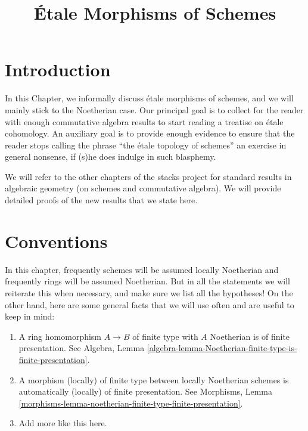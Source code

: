 

%


\title{\'Etale Morphisms of Schemes}

\maketitle

\label{section-phantom}

\tableofcontents



\section{Introduction}
\label{section-introduction}

\noindent
In this Chapter, we informally discuss \'etale morphisms of schemes,
and we will mainly stick to the Noetherian case. Our principal goal
is to collect for the reader with enough commutative algebra results
to start reading a treatise on \'etale cohomology. An auxiliary goal is to
provide enough evidence to ensure that the reader stops calling the phrase
``the \'etale topology of schemes'' an exercise in general nonsense, if (s)he
does indulge in such blasphemy.

\medskip\noindent
We will refer to the other
chapters of the stacks project for standard results in algebraic geometry
(on schemes and commutative algebra). We will provide detailed
proofs of the new results that we state here.




\section{Conventions}
\label{section-conventions}

\noindent
In this chapter, frequently schemes will be assumed locally Noetherian
and frequently rings will be assumed Noetherian. But in all the statements
we will reiterate this when necessary, and make sure we list all the
hypotheses! On the other hand, here are some general facts that we will use
often and are useful to keep in mind:
\begin{enumerate}
\item A ring homomorphism $A \to B$ of finite type with $A$ Noetherian
is of finite presentation. See Algebra,
Lemma \ref{algebra-lemma-Noetherian-finite-type-is-finite-presentation}.
\item A morphism (locally) of finite type between locally Noetherian schemes
is automatically (locally) of finite presentation.
See Morphisms,
Lemma \ref{morphisms-lemma-noetherian-finite-type-finite-presentation}.
\item Add more like this here.
\end{enumerate}




